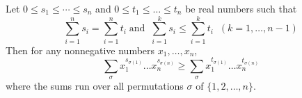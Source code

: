 \documentclass[12pt]{article}
\begin{document}
Let $0\leq s_1\leq\cdots\leq s_n$ and $0\leq t_1\leq\dots\leq t_n$ 
be real numbers such that
\[\sum_{i=1}^n s_i = \sum_{i=1}^n t_i\; \mbox{and}
\;\; \sum_{i=1}^k s_i \leq \sum_{i=1}^k t_i\;\; (k=1,\dots,n-1)\]
Then for any nonnegative numbers $x_1,\dots,x_n$, 
\[\sum_\sigma x_1^{s_{\sigma(1)}}\dots x_n^{s_{\sigma(n)}} \geq 
\sum_\sigma x_1^{t_{\sigma(1)}}\dots x_n^{t_{\sigma(n)}}\]
where the sums run over all permutations $\sigma$ of $\{1,2,\dots,n\}$.
\end{document}
